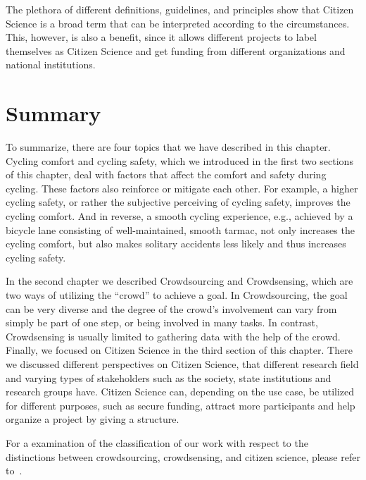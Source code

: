 The plethora of different definitions, guidelines, and principles show that Citizen Science is a broad term that can be interpreted according to the circumstances.
This, however, is also a benefit, since it allows different projects to label themselves as Citizen Science and get funding from different organizations and national institutions.

\section{Summary}
\label{sec:summary_background}
To summarize, there are four topics that we have described in this chapter.
Cycling comfort and cycling safety, which we introduced in the first two sections of this chapter, deal with factors that affect the comfort and safety during cycling.
These factors also reinforce or mitigate each other.
For example, a higher cycling safety, or rather the subjective perceiving of cycling safety, improves the cycling comfort.
And in reverse, a smooth cycling experience, e.g., achieved by a bicycle lane consisting of well-maintained, smooth tarmac, not only increases the cycling comfort, but also makes solitary accidents less likely and thus increases cycling safety.

In the second chapter we described Crowdsourcing and Crowdsensing, which are two ways of utilizing the ``crowd'' to achieve a goal.
In Crowdsourcing, the goal can be very diverse and the degree of the crowd's involvement can vary from simply be part of one step, or being involved in many tasks.
In contrast, Crowdsensing is usually limited to gathering data with the help of the crowd.
Finally, we focused on Citizen Science in the third section of this chapter.
There we discussed different perspectives on Citizen Science, that different research field and varying types of stakeholders such as the society, state institutions and research groups have.
Citizen Science can, depending on the use case, be utilized for different purposes, such as secure funding, attract more participants and help organize a project by giving a structure.

For a examination of the classification of our work with respect to the distinctions between crowdsourcing, crowdsensing, and citizen science, please refer to~.

